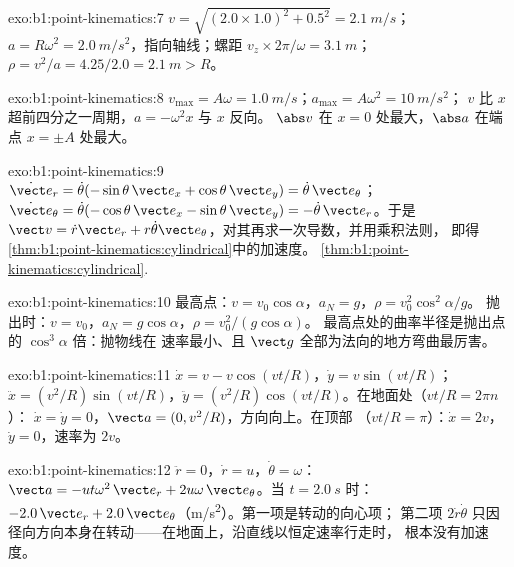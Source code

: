 \begin{solution}{exo:b1:point-kinematics:7}
$v = \sqrt{(2.0 \times 1.0)^2 + 0.5^2} = \qty{2.1}{m/s}$；$a = R\omega^2 =
\qty{2.0}{m/s^2}$，指向轴线；螺距 $v_z \times 2\pi/\omega =
\qty{3.1}{m}$；$\rho = v^2/a = 4.25/2.0 = \qty{2.1}{m} > R$。
\end{solution}

\begin{solution}{exo:b1:point-kinematics:8}
$v_{\max} = A\omega = \qty{1.0}{m/s}$；$a_{\max} = A\omega^2 = \qty{10}{m/s^2}$；
$v$ 比 $x$ 超前四分之一周期，$a = -\omega^2x$ 与 $x$ 反向。
$\abs v$ 在 $x = 0$ 处最大，$\abs a$ 在端点 $x = \pm A$ 处最大。
\end{solution}

\begin{solution}{exo:b1:point-kinematics:9}
$\dot{\vect e}_r = \dot\theta(-\sin\theta\,\vect e_x + \cos\theta\,\vect e_y)
= \dot\theta\,\vect e_\theta$；$\dot{\vect e}_\theta = \dot\theta(-\cos\theta\,
\vect e_x - \sin\theta\,\vect e_y) = -\dot\theta\,\vect e_r$。于是
$\vect v = \dot r\vect e_r + r\dot\theta\vect e_\theta$，对其再求一次导数，并用乘积法则，
即得\cref{thm:b1:point-kinematics:cylindrical}中的加速度。
\cref{thm:b1:point-kinematics:cylindrical}.
\end{solution}

\begin{solution}{exo:b1:point-kinematics:10}
最高点：$v = v_0\cos\alpha$，$a_N = g$，$\rho = v_0^2\cos^2\alpha/g$。
抛出时：$v = v_0$，$a_N = g\cos\alpha$，$\rho = v_0^2/(g\cos\alpha)$。
最高点处的曲率半径是抛出点的 $\cos^3\alpha$ 倍：抛物线在
速率最小、且 $\vect g$ 全部为法向的地方弯曲最厉害。
\end{solution}

\begin{solution}{exo:b1:point-kinematics:11}
$\dot x = v - v\cos(vt/R)$，$\dot y = v\sin(vt/R)$；$\ddot x = (v^2/R)
\sin(vt/R)$，$\ddot y = (v^2/R)\cos(vt/R)$。在地面处（$vt/R = 2\pi n$）：
$\dot x = \dot y = 0$，$\vect a = (0, v^2/R)$，方向向上。在顶部
（$vt/R = \pi$）：$\dot x = 2v$，$\dot y = 0$，速率为 $2v$。
\end{solution}

\begin{solution}{exo:b1:point-kinematics:12}
$\ddot r = 0$，$\dot r = u$，$\dot\theta = \omega$：$\vect a = -ut\omega^2\,
\vect e_r + 2u\omega\,\vect e_\theta$。当 $t = \qty{2.0}{s}$ 时：$-2.0\,\vect e_r
+ 2.0\,\vect e_\theta$（\unit{m/s^2}）。第一项是转动的向心项；
第二项 $2\dot r\dot\theta$ 只因
径向方向本身在转动——在地面上，沿直线以恒定速率行走时，
根本没有加速度。
\end{solution}

